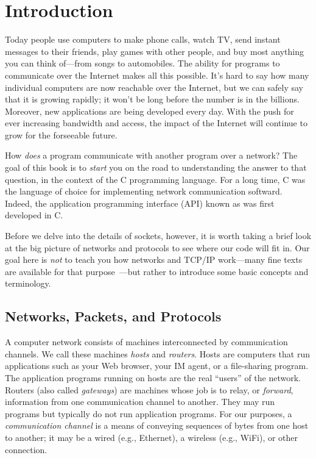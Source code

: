 \setcounter{page}{1}

\chapter{Introduction}
\label{chap:intro}

Today people use computers to make phone calls, watch TV, send
instant messages to their friends, play games with other people,
and buy most anything you can think of---from songs to automobiles.  The
ability for programs to communicate over the Internet makes all this
possible.  It's hard to say how many individual computers are now
reachable over the Internet, but we can safely say that it is growing
rapidly; it won't be long before the number is in the billions.
Moreover, new applications are being developed every day.  With the
push for ever increasing bandwidth and access, the impact of the
Internet will continue to grow for the forseeable future.

How \emph{does\/} a program communicate with another program over a
network?  The goal of this book is to \emph{start\/} you on the road
to understanding the answer to that question, in the context of the
C programming language.  For a long time, C was the language of choice
for implementing network communication softward.  Indeed, the 
application programming interface (API) known as  was
first developed in C.

Before we delve into the details of sockets, however, it is worth
taking a brief look at the big picture of networks and protocols to
see where our code will fit in.  Our goal here is \emph{not\/} to
teach you how networks and TCP/IP work---many fine texts are available
for that purpose~\cite{ComerV1,ComerV3,PandD,StevensV1,StevensV2}---but
rather to introduce some basic concepts and terminology.

\section{Networks, Packets, and Protocols}

A computer network consists of machines interconnected by
communication channels. We call these machines \emph{hosts} and
\emph{routers}.  Hosts are computers that run applications such as
your Web browser, your IM agent, or a file-sharing program.
The application programs running on hosts are the
real ``users'' of the network.  Routers (also called \emph{gateways}) are machines whose job is to
relay, or \emph{forward}, information from one communication channel
to another.  They may run programs but typically do not run
application programs.  For our purposes, a \emph{communication
channel} is a means of conveying sequences of bytes from one host to
another; it may be a wired (e.g., Ethernet), a wireless (e.g., WiFi), or
other connection.

